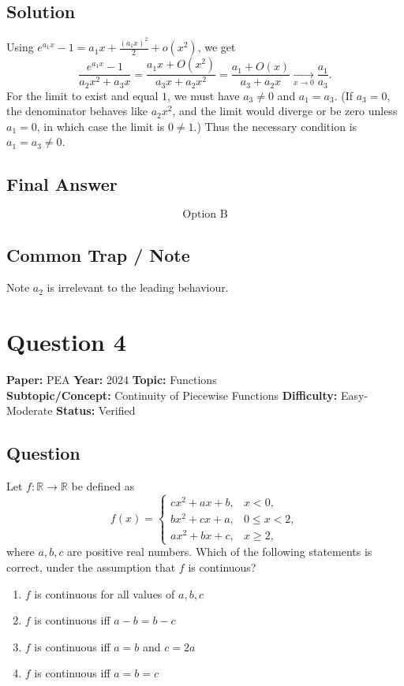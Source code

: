 \documentclass[11pt]{article}
\begin{document}
\subsection*{Solution}
Using $e^{a_1 x}-1 = a_1 x + \tfrac{(a_1 x)^2}{2}+o(x^2)$, we get
\[
\frac{e^{a_1 x}-1}{a_2 x^{2}+a_3 x}
= \frac{a_1 x + O(x^2)}{a_3 x + a_2 x^2}
= \frac{a_1 + O(x)}{a_3 + a_2 x}\xrightarrow[x\to 0]{}\frac{a_1}{a_3}.
\]
For the limit to exist and equal $1$, we must have $a_3\ne 0$ and $a_1=a_3$. (If $a_3=0$, the denominator behaves like $a_2 x^2$, and the limit would diverge or be zero unless $a_1=0$, in which case the limit is $0\ne 1$.) Thus the necessary condition is $a_1=a_3\ne 0$.

\subsection*{Final Answer}
\[
\boxed{\text{Option B}}
\]

\subsection*{Common Trap / Note}
Note $a_2$ is irrelevant to the leading behaviour.

\section*{Question 4}
\textbf{Paper:} PEA \quad \textbf{Year:} 2024 \quad \textbf{Topic:} Functions \\
\textbf{Subtopic/Concept:} Continuity of Piecewise Functions \quad \textbf{Difficulty:} Easy-Moderate \quad \textbf{Status:} Verified

\subsection*{Question}
Let $f:\mathbb{R}\to\mathbb{R}$ be defined as
\[
f(x)=\begin{cases}
cx^{2}+ax+b, & x<0,\\
bx^{2}+cx+a, & 0\le x<2,\\
ax^{2}+bx+c, & x\ge 2,
\end{cases}
\]
where $a,b,c$ are positive real numbers. Which of the following statements is correct, under the assumption that $f$ is continuous?
\begin{enumerate}[label=(\Alph*)]
\item $f$ is continuous for all values of $a,b,c$
\item $f$ is continuous iff $a-b=b-c$
\item $f$ is continuous iff $a=b$ and $c=2a$
\item $f$ is continuous iff $a=b=c$
\end{enumerate}
\end{document}
